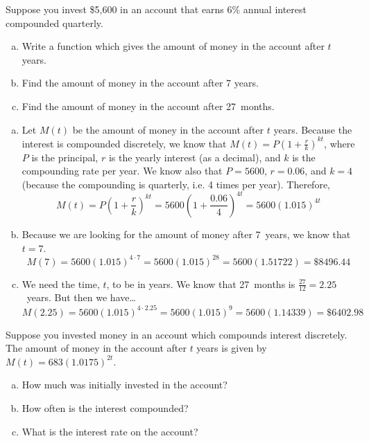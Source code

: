 \documentclass[11pt,letterpaper]{article}
\begin{document}
\newpage



 Suppose you invest \$5,600 in an account that earns 6\% annual interest compounded quarterly. 
\begin{enumerate}[(a)]
\item Write a function which gives the amount of money in the account after $t$ years.
\item Find the amount of money in the account after 7 years. 
\item Find the amount of money in the account after 27~months. 
\end{enumerate} \pspace

\sol
\begin{enumerate}[(a)]
\item Let $M(t)$ be the amount of money in the account after $t$ years. Because the interest is compounded discretely, we know that $M(t)= P(1 + \frac{r}{k})^{kt}$, where $P$ is the principal, $r$ is the yearly interest (as a decimal), and $k$ is the compounding rate per year. We know also that $P= 5600$, $r= 0.06$, and $k= 4$ (because the compounding is quarterly, i.e. 4 times per year). Therefore, 
	\[
	M(t)= P \left(1 + \dfrac{r}{k} \right)^{kt}= 5600 \left( 1 + \dfrac{0.06}{4} \right)^{4t}= 5600(1.015)^{4t}
	\] \pspace

\item Because we are looking for the amount of money after 7~years, we know that $t= 7$.
	\[
	M(7)= 5600(1.015)^{4 \cdot 7}= 5600(1.015)^{28}= 5600(1.51722)= \$8496.44
	\] \pspace

\item We need the time, $t$, to be in years. We know that 27~months is $\frac{27}{12}= 2.25$~years. But then we have\dots
	\[
	M(2.25)= 5600(1.015)^{4 \cdot 2.25}= 5600(1.015)^9= 5600(1.14339)= \$6402.98
	\]
\end{enumerate}



\newpage



 Suppose you invested money in an account which compounds interest discretely. The amount of money in the account after $t$ years is given by $M(t)= 683(1.0175)^{2t}$.
\begin{enumerate}[(a)]
\item How much was initially invested in the account?
\item How often is the interest compounded?
\item What is the interest rate on the account?
\end{enumerate} \pspace
\end{document}

